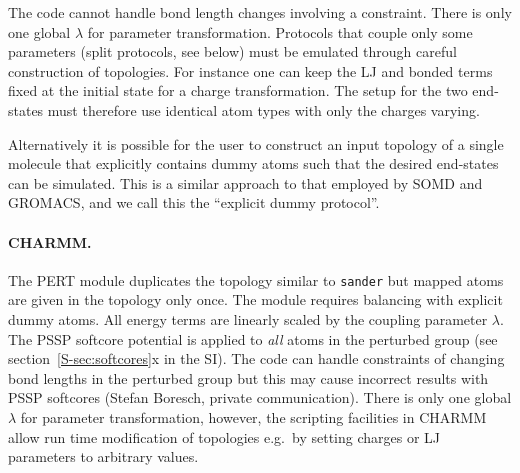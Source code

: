 \documentclass[journal=jctcce,manuscript=article]{achemso}
\newcommand{\progname}[1]{\texttt{#1}}
\begin{document}

%
The code cannot handle bond length changes involving a constraint.  
There is only one global $\lambda$ for parameter transformation.  Protocols that couple only some parameters (split protocols, see below) must be emulated through careful construction of topologies. For instance one can keep the LJ and bonded terms fixed at the initial state for a charge transformation.  The setup for 
the two end-states must therefore use identical atom types with only the charges varying.

Alternatively it is possible for the user to construct an input topology of a single molecule that explicitly contains dummy atoms such that the desired end-states can be simulated. This is a similar approach to that employed by SOMD and GROMACS, and we call this the ``explicit dummy protocol''. 

\paragraph{CHARMM.} The PERT module duplicates the topology similar to
\progname{sander} but mapped atoms are given in the topology only once.
The module requires balancing with explicit dummy atoms.  All energy terms are
linearly scaled by the coupling parameter $\lambda$.  The PSSP softcore potential is applied to \emph{all}
atoms in the perturbed group (see section~\ref{S-sec:softcores}x in the SI).  
The code can handle constraints of changing bond lengths in the perturbed group but this may cause incorrect results with PSSP softcores (Stefan Boresch, private communication).  There is only one global $\lambda$ for parameter
transformation, however, the scripting facilities in CHARMM allow run time
modification of topologies e.g.\ by setting charges or LJ parameters
to arbitrary values.
\end{document}
